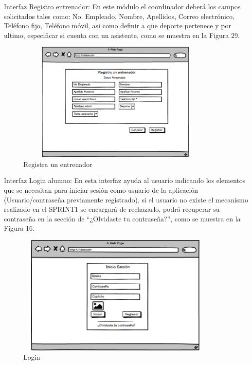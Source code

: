 	\noindent Interfaz Registro entrenador: En este  módulo el coordinador deberá los campos solicitados tales como: No. Empleado, Nombre, Apellidos, Correo electrónico, Teléfono fijo, Teléfono móvil, asi como definir a que deporte pertenece y por ultimo, especificar si cuenta con un asistente, como se muestra en la Figura 29.
	\begin{figure}[hbt!]
		\centering
		\includegraphics[width=10cm, height=6cm]{Imagenes/Disenos/p12Registroentrenador.png}
		\caption{Registra un entrenador}
	\end{figure}
	\pagebreak
	
	\noindent Interfaz Login alumno: En esta interfaz ayuda al usuario indicando los elementos que se necesitan para iniciar sesión como usuario de la aplicación (Usuario/contraseña previamente registrado), si el usuario no existe el mecanismo realizado en el SPRINT1 se encargará de rechazarlo, podrá recuperar su contraseña en la sección de “¿Olvidaste tu contraseña?”, como se muestra en la Figura 16. \pagebreak
	\begin{figure}[hbt!]
		\centering
		\includegraphics[width=10cm, height=6cm]{Imagenes/Disenos/p1Login.png}
		\caption{Login}
	\end{figure}

